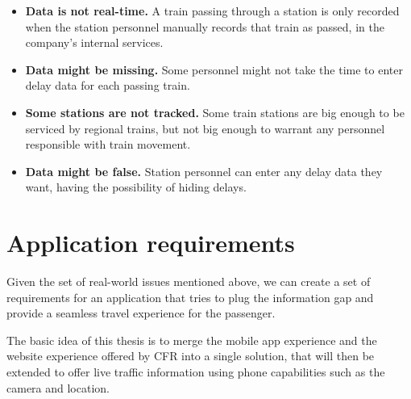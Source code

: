 \begin{itemize}
    \item \textbf{Data is not real-time.} A train passing through a station is only recorded when the station personnel manually records that train as passed, in the company's internal services.
    \item \textbf{Data might be missing.} Some personnel might not take the time to enter delay data for each passing train.
    \item \textbf{Some stations are not tracked.} Some train stations are big enough to be serviced by regional trains, but not big enough to warrant any personnel responsible with train movement.
    \item \textbf{Data might be false.} Station personnel can enter any delay data they want, having the possibility of hiding delays.
\end{itemize}

\section{Application requirements}
\label{sec:Requirements}

Given the set of real-world issues mentioned above, we can create a set of requirements for an application that tries to plug the information gap and provide a seamless travel experience for the passenger.

The basic idea of this thesis is to merge the mobile app experience and the website experience offered by CFR into a single solution, that will then be extended to offer live traffic information using phone capabilities such as the camera and location.

